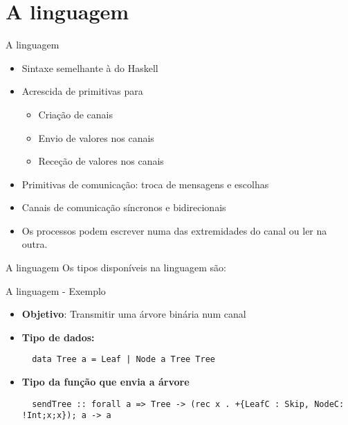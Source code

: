\section{A linguagem}

\begin{frame}[fragile]{A linguagem}

  \begin{itemize}
  \item Sintaxe semelhante à do Haskell
  \newline
  \item Acrescida de primitivas para
    \begin{itemize}
    \item Criação de canais
    \item Envio de valores nos canais
    \item Receção de valores nos canais
    \end{itemize}
 
  \item Primitivas de comunicação: troca de mensagens e escolhas
  \newline
  \item Canais de comunicação síncronos e bidirecionais
  \newline
  \item Os processos podem escrever numa das extremidades do canal ou ler na outra.
  \end{itemize}  
\end{frame}

\begin{frame}[fragile]{A linguagem}
  Os tipos disponíveis na linguagem são:
    
\end{frame}

\lstset{language=CFST, style=eclipse, frame=none, numbers=none}
\begin{frame}[fragile]{A linguagem - Exemplo}
  \begin{itemize}
  \item \textbf{Objetivo}: Transmitir uma árvore binária num canal
    \newline
  \item \textbf{Tipo de dados:}
\begin{lstlisting}
  data Tree a = Leaf | Node a Tree Tree
\end{lstlisting}

  \item \textbf{Tipo da função que envia a árvore}
\begin{lstlisting}
  sendTree :: forall a => Tree -> (rec x . +{LeafC : Skip, NodeC: !Int;x;x}); a -> a
\end{lstlisting}
  \end{itemize}
\end{frame}

